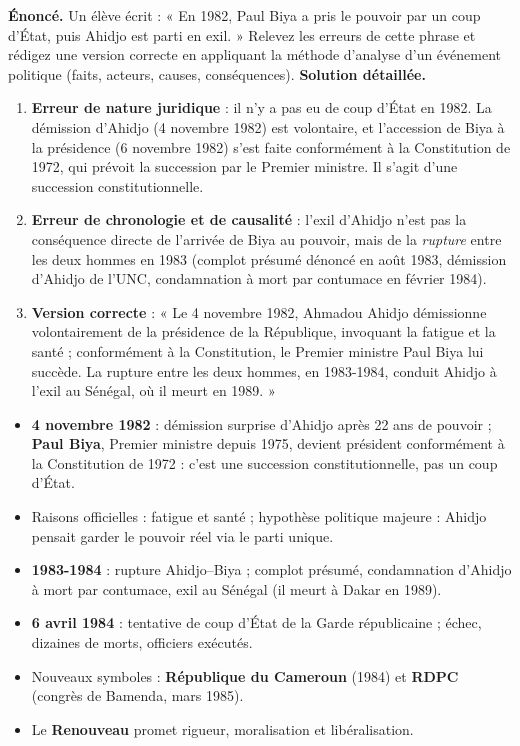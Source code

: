 \documentclass[11pt]{article}
\newcommand{\cle}[1]{{\popxbold\color{popdark}#1}}
\begin{document}
\begin{exoresolu}
\textbf{Énoncé.} Un élève écrit : « En 1982, Paul Biya a pris le pouvoir par un coup d'État, puis Ahidjo est parti en exil. » Relevez les erreurs de cette phrase et rédigez une version correcte en appliquant la méthode d'analyse d'un événement politique (faits, acteurs, causes, conséquences).
\tcblower
\textbf{Solution détaillée.}
\begin{enumerate}
\item \textbf{Erreur de nature juridique} : il n'y a pas eu de coup d'État en 1982. La démission d'Ahidjo (4 novembre 1982) est volontaire, et l'accession de Biya à la présidence (6 novembre 1982) s'est faite conformément à la Constitution de 1972, qui prévoit la succession par le Premier ministre. Il s'agit d'une \cle{succession constitutionnelle}.
\item \textbf{Erreur de chronologie et de causalité} : l'exil d'Ahidjo n'est pas la conséquence directe de l'arrivée de Biya au pouvoir, mais de la \emph{rupture} entre les deux hommes en 1983 (complot présumé dénoncé en août 1983, démission d'Ahidjo de l'UNC, condamnation à mort par contumace en février 1984).
\item \textbf{Version correcte} : « Le 4 novembre 1982, Ahmadou Ahidjo démissionne volontairement de la présidence de la République, invoquant la fatigue et la santé ; conformément à la Constitution, le Premier ministre Paul Biya lui succède. La rupture entre les deux hommes, en 1983-1984, conduit Ahidjo à l'exil au Sénégal, où il meurt en 1989. »
\end{enumerate}
\end{exoresolu}

\begin{aretenir}
\begin{itemize}
\item \textbf{4 novembre 1982} : démission surprise d'Ahidjo après 22 ans de pouvoir ; \textbf{Paul Biya}, Premier ministre depuis 1975, devient président conformément à la Constitution de 1972 : c'est une succession constitutionnelle, pas un coup d'État.
\item Raisons officielles : fatigue et santé ; hypothèse politique majeure : Ahidjo pensait garder le pouvoir réel via le parti unique.
\item \textbf{1983-1984} : rupture Ahidjo--Biya ; complot présumé, condamnation d'Ahidjo à mort par contumace, exil au Sénégal (il meurt à Dakar en 1989).
\item \textbf{6 avril 1984} : tentative de coup d'État de la Garde républicaine ; échec, dizaines de morts, officiers exécutés.
\item Nouveaux symboles : \textbf{République du Cameroun} (1984) et \textbf{RDPC} (congrès de Bamenda, mars 1985).
\item Le \textbf{Renouveau} promet rigueur, moralisation et libéralisation.
\end{itemize}
\end{aretenir}
\end{document}
